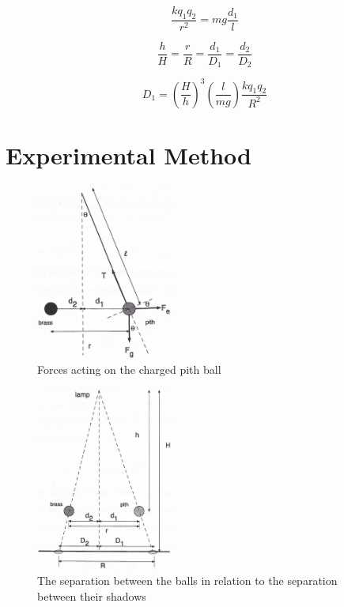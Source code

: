 \documentclass[letterpaper]{article}
\begin{document}
  \begin{equation}
    \frac{k q_1 q_2}{r^2}=mg\frac{d_1}{l}
  \end{equation}

  \begin{equation}
    \frac{h}{H}=\frac{r}{R}=\frac{d_1}{D_1}=\frac{d_2}{D_2}
  \end{equation}

  \begin{equation}
    D_1=(\frac{H}{h})^3 (\frac{l}{mg}) \frac{k q_1 q_2}{R^2}
  \end{equation}

\section{Experimental Method}

\begin{figure}[h!]
    \centering
    \includegraphics[width=0.4\textwidth]{fig1crop.png}
    \caption{Forces acting on the charged pith ball}
\end{figure}

\begin{figure}[h!]
    \centering
    \includegraphics[width=0.4\textwidth]{fig2crop.png}
    \caption{The separation between the balls in relation to the separation between their shadows}
\end{figure}
\end{document}

